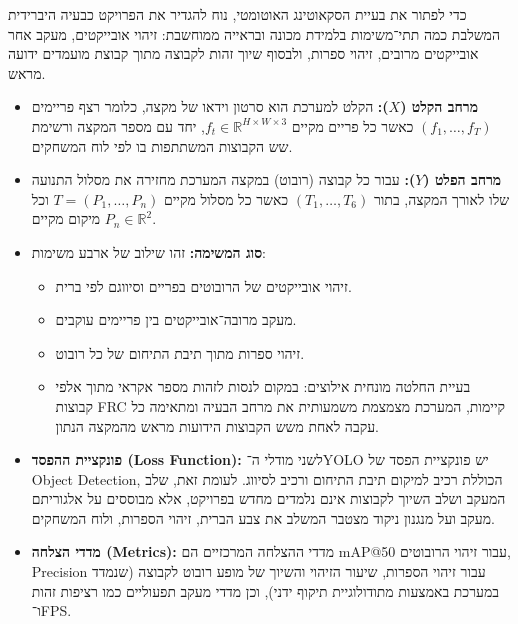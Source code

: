 כדי לפתור את בעיית הסקאוטינג האוטומטי, נוח להגדיר את הפרויקט כבעיה
היברידית המשלבת כמה תתי־משימות בלמידת מכונה ובראייה ממוחשבת: זיהוי
אובייקטים, מעקב אחר אובייקטים מרובים, זיהוי ספרות, ולבסוף שיוך זהות
לקבוצה מתוך קבוצת מועמדים ידועה מראש.

\begin{itemize}
    \item \textbf{מרחב הקלט ($X$):} הקלט למערכת הוא סרטון וידאו של
    מקצה, כלומר רצף פריימים \linebreak ${(f_1,\dots,f_T)}$ כאשר כל פריים מקיים
    ${f_t \in \mathbb{R}^{H \times W \times 3}}$, יחד עם מספר המקצה
    ורשימת שש הקבוצות המשתתפות בו לפי לוח המשחקים.
    
  \item \textbf{מרחב הפלט ($Y$):} עבור כל קבוצה (רובוט) במקצה המערכת מחזירה את מסלול התנועה שלו
    לאורך המקצה, בתור $(T_1,\dots,T_6)$ כאשר כל מסלול מקיים $T=(P_1,\dots,P_n)$ וכל מיקום מקיים $P_n \in \mathbb{R}^2$.

    \item \textbf{סוג המשימה:} זהו שילוב של ארבע משימות:
    \begin{itemize}
        \item זיהוי אובייקטים של הרובוטים בפריים וסיווגם לפי ברית.
        \item מעקב מרובה־אובייקטים בין פריימים עוקבים.
        \item זיהוי ספרות מתוך תיבת התיחום של כל רובוט.
        \item בעיית החלטה מונחית אילוצים: במקום לנסות לזהות מספר אקראי
          מתוך אלפי קבוצות \textenglish{FRC} קיימות, המערכת מצמצמת
          משמעותית את מרחב הבעיה ומתאימה כל עקבה לאחת משש הקבוצות
          הידועות מראש מהמקצה הנתון.
    \end{itemize}

    \item \textbf{פונקציית ההפסד (\textenglish{Loss Function}):} לשני
    מודלי ה־\textenglish{YOLO} יש פונקציית הפסד של \textenglish{Object
    Detection}, הכוללת רכיב למיקום תיבת התיחום ורכיב לסיווג. לעומת זאת,
    שלב המעקב ושלב השיוך לקבוצות אינם נלמדים מחדש בפרויקט, אלא מבוססים
    על אלגוריתם מעקב ועל מנגנון ניקוד מצטבר המשלב את צבע הברית, זיהוי
    הספרות, ולוח המשחקים.

  \item \textbf{מדדי הצלחה (\textenglish{Metrics}):} מדדי ההצלחה
    המרכזיים הם \textenglish{mAP@50} עבור זיהוי הרובוטים,
    \textenglish{Precision} עבור זיהוי הספרות, שיעור הזיהוי והשיוך של
    מופע רובוט לקבוצה (שנמדד במערכת באמצעות מתודולוגיית תיקוף ידני),
    וכן מדדי מעקב תפעוליים כמו רציפות זהות ו־\textenglish{FPS}.
\end{itemize}
